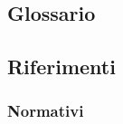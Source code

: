 %
%

\subsection{Glossario}
\descrizioneGlossario

\subsection{Riferimenti}

\subsubsection{Normativi}
\riferimentiNormativi

